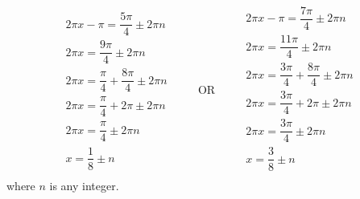 \documentclass[12pt,letterpaper]{exam}
\begin{document}
\begin{questions}
	\[
	\begin{gathered}
	2\pi x - \pi= \dfrac{5\pi}{4} \pm 2 \pi n \\[0.1cm]
	2\pi x= \dfrac{9\pi}{4} \pm 2 \pi n \\[0.1cm]
	2\pi x= \dfrac{\pi}{4} + \dfrac{8\pi}{4} \pm 2 \pi n \\[0.1cm]
	2\pi x= \dfrac{\pi}{4} + 2\pi \pm 2 \pi n \\[0.1cm]
	2\pi x= \dfrac{\pi}{4} \pm 2 \pi n \\[0.1cm]
	\boxed{x= \dfrac{1}{8} \pm n}
	\end{gathered}
	\qquad \text{ OR } \qquad
	\begin{gathered}
	2\pi x - \pi= \dfrac{7\pi}{4} \pm 2 \pi n \\[0.1cm]
	2\pi x= \dfrac{11\pi}{4} \pm 2 \pi n \\[0.1cm]
	2\pi x= \dfrac{3\pi}{4} + \dfrac{8\pi}{4} \pm 2 \pi n \\[0.1cm]
	2\pi x= \dfrac{3\pi}{4} + 2\pi \pm 2 \pi n \\[0.1cm]
	2\pi x= \dfrac{3\pi}{4} \pm 2 \pi n \\[0.1cm]
	\boxed{x= \dfrac{3}{8} \pm n} \\[0.1cm]
	\end{gathered}
	\]
where $n$ is any integer. 

\end{questions}
\end{document}
